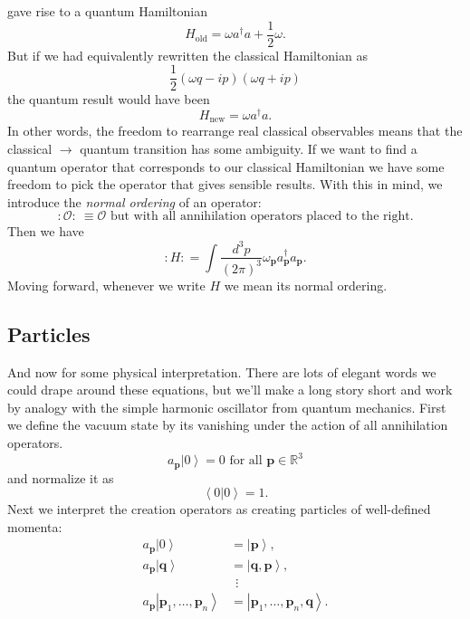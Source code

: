 \documentclass[12 pt]{article}
\newcommand{\R}{\mathbb{R}}
\newcommand{\KET}[1]{\left| #1 \right\rangle }
\newcommand{\IP}[2]{\left\langle #1 \left| #2 \right\rangle \right.}
\newcommand{\B}[1]{\mathbf{#1}}
\numberwithin{equation}{section}
\begin{document}
gave rise to a quantum Hamiltonian \begin{equation*}
H_{\mbox{old}} = \omega a^\dagger a + \frac{1}{2} \omega.
\end{equation*}
But if we had equivalently rewritten the classical Hamiltonian as \begin{equation*}
\frac{1}{2} (\omega q - ip)(\omega q + ip)
\end{equation*}
the quantum result would have been \begin{equation*}
H_{\mbox{new}} = \omega a^\dagger a .
\end{equation*}
In other words, the freedom to rearrange real classical observables means that the classical $\rightarrow$ quantum transition has some ambiguity. If we want to find a quantum operator that corresponds to our classical Hamiltonian we have some freedom to pick the operator that gives sensible results. With this in mind, we introduce the \textit{normal ordering} of an operator: \begin{equation*}
: \mathcal{O}: \ \equiv \mathcal{O} \mbox{ but with all annihilation operators placed to the right}.
\end{equation*}
Then we have \begin{equation*}
:H: = \int \frac{d^3 p}{(2 \pi)^3} \omega_{\B{p}} a_{\B{p}}^\dagger a_{\B{p}}.
\end{equation*}
Moving forward, whenever we write $H$ we mean its normal ordering.

\subsection{Particles}

And now for some physical interpretation. There are lots of elegant words we could drape around these equations, but we'll make a long story short and work by analogy with the simple harmonic oscillator from quantum mechanics. First we define the vacuum state by its vanishing under the action of all annihilation operators. \begin{equation*}
a_{\B{p}} \KET{0} = 0 \mbox{ for all } \B{p} \in \R^3
\end{equation*}
and normalize it as \begin{equation*}
\IP{0}{0} = 1.
\end{equation*}
Next we interpret the creation operators as creating particles of well-defined momenta: \begin{align*}
a_{\B{p}} \KET{0} & = \KET{\B{p}}, \\
a_{\B{p}} \KET{\B{q}} & = \KET{\B{q}, \B{p}}, \\
\ & \ \ \vdots \\
a_{\B{p}} \KET{\B{p}_1, \ldots, \B{p}_n} & = \KET{\B{p}_1, \ldots, \B{p}_n, \B{q}}.
\end{align*}
\end{document}
